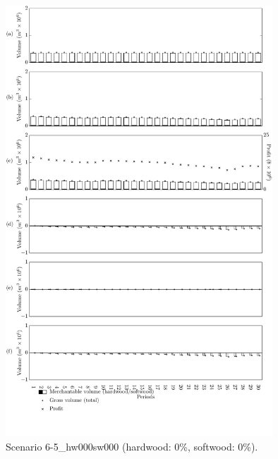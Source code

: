 \begin{figure}[h]
  \centering
  \includegraphics[width=10cm]{images/appendix/s6-5_hw000sw000}
  \caption{Scenario 6-5\_hw000sw000 (hardwood: 0\%, softwood: 0\%).}
  \label{fig:s6-5_hw000sw000}
\end{figure}

